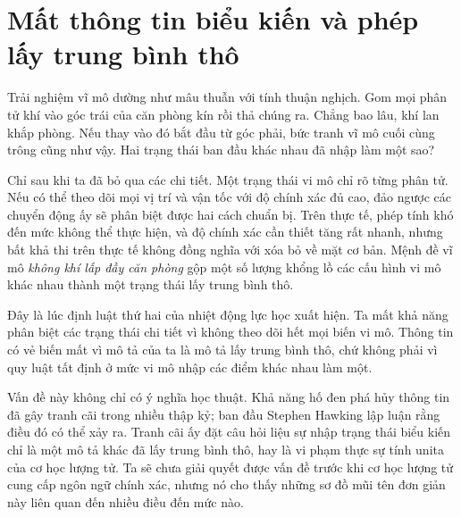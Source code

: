 \section{Mất thông tin biểu kiến và phép lấy trung bình thô}

Trải nghiệm vĩ mô dường như mâu thuẫn với tính thuận nghịch. Gom mọi phân tử khí vào góc trái của căn phòng kín rồi thả chúng ra. Chẳng bao lâu, khí lan khắp phòng. Nếu thay vào đó bắt đầu từ góc phải, bức tranh vĩ mô cuối cùng trông cũng như vậy. Hai trạng thái ban đầu khác nhau đã nhập làm một sao?

Chỉ sau khi ta đã bỏ qua các chi tiết. Một trạng thái vi mô chỉ rõ từng phân tử. Nếu có thể theo dõi mọi vị trí và vận tốc với độ chính xác đủ cao, đảo ngược các chuyển động ấy sẽ phân biệt được hai cách chuẩn bị. Trên thực tế, phép tính khó đến mức không thể thực hiện, và độ chính xác cần thiết tăng rất nhanh, nhưng bất khả thi trên thực tế không đồng nghĩa với xóa bỏ về mặt cơ bản. Mệnh đề vĩ mô \emph{không khí lấp đầy căn phòng} gộp một số lượng khổng lồ các cấu hình vi mô khác nhau thành một trạng thái lấy trung bình thô.

Đây là lúc định luật thứ hai của nhiệt động lực học xuất hiện. Ta mất khả năng phân biệt các trạng thái chi tiết vì không theo dõi hết mọi biến vi mô. Thông tin có vẻ biến mất vì mô tả của ta là mô tả lấy trung bình thô, chứ không phải vì quy luật tất định ở mức vi mô nhập các điểm khác nhau làm một.

\begin{classroomqa}
\end{classroomqa}

Vấn đề này không chỉ có ý nghĩa học thuật. Khả năng hố đen phá hủy thông tin đã gây tranh cãi trong nhiều thập kỷ; ban đầu Stephen Hawking lập luận rằng điều đó có thể xảy ra. Tranh cãi ấy đặt câu hỏi liệu sự nhập trạng thái biểu kiến chỉ là một mô tả khác đã lấy trung bình thô, hay là vi phạm thực sự tính unita của cơ học lượng tử. Ta sẽ chưa giải quyết được vấn đề trước khi cơ học lượng tử cung cấp ngôn ngữ chính xác, nhưng nó cho thấy những sơ đồ mũi tên đơn giản này liên quan đến nhiều điều đến mức nào.

